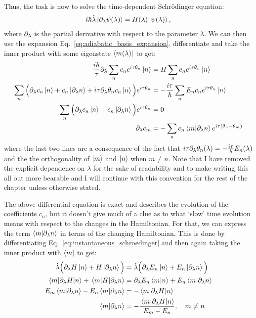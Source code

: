     Thus, the task is now to solve the time-dependent Schr\"{o}dinger equation:
    \begin{equation}\label{eq:td-schroedinger}
        i\hbar \dot{\lambda} \ket{\partial_{\lambda} \psi(\lambda)} = H(\lambda) \ket{\psi(\lambda)},
    \end{equation}
    where $\partial_{\lambda}$ is the partial derivative with respect to the parameter $\lambda$. We can then use the expansion Eq.~\eqref{eq:adiabatic_basis_expansion}, differentiate and take the inner product with some eigenstate $\bra{m(\lambda)}$ to get:
    \begin{equation}\label{eq:adiabatic_derivation}
        \begin{aligned}
         \frac{i\hbar}{\tau} \partial_{\lambda} \sum_n c_n e^{i \tau \theta_n} \ket{n} &= H \sum_n c_n e^{i \tau \theta_n} \ket{n} \\
        \sum_n \Big( \partial_{\lambda} c_n \ket{n} + c_n \ket{\partial_{\lambda} n} + i \tau \partial_{\lambda}\theta_n c_n \ket{n} \Big)e^{i \tau \theta_n} &= -\frac{i \tau}{\hbar} \sum_n E_n c_n e^{i \tau \theta_n} \ket{n} \\
        \sum_n \Big( \partial_{\lambda} c_n \ket{n} + c_n \ket{\partial_{\lambda} n} \Big)e^{i \tau \theta_n} &= 0 \\
        \partial_{\lambda} c_m  &= - \sum_n c_n \braket{m}{\partial_{\lambda} n}e^{i\tau(\theta_n-\theta_m)}
        \end{aligned}
    \end{equation}
    where the last two lines are a consequence of the fact that $i \tau \partial_{\lambda} \theta_n(\lambda) = -\frac{i \tau}{\hbar} E_n(\lambda)$ and the the orthogonality of $\ket{m}$ and $\ket{n}$ when $m \neq n$. Note that I have removed the explicit dependence on $\lambda$ for the sake of readability and to make writing this all out more bearable and I will continue with this convention for the rest of the chapter unless otherwise stated. 
    
    The above differential equation is exact and describes the evolution of the coefficients $c_n$,  but it doesn't give much of a clue as to what `slow' time evolution means with respect to the changes in the Hamiltonian. For that, we can express the term $\braket{m}{\partial_{\lambda} n}$ in terms of the changing Hamiltonian. This is done by differentiating Eq.~\eqref{eq:instantaneous_schroedinger} and then again taking the inner product with $\bra{m}$ to get:
    \begin{equation}\label{eq:hamiltonian_derivative}
        \begin{aligned}
            \dot{\lambda} \Big(\partial_{\lambda}{H}\ket{n} + H \ket{\partial_{\lambda} n}\Big)  &= \dot{\lambda} \Big(\partial_{\lambda}{E_n}\ket{n} + E_n \ket{\partial_{\lambda} n}\Big) \\
            \mel{m}{\partial_{\lambda}H}{n} + \mel{m}{H}{\partial_{\lambda}n} &= \partial_{\lambda} E_n\braket{m}{n} + E_n \braket{m}{\partial_{\lambda} n} \\
            E_m \braket{m}{\partial_{\lambda} n} - E_n \braket{m}{\partial_{\lambda} n} &= - \mel{m}{\partial_{\lambda}H}{n} \\
            \braket{m}{\partial_{\lambda} n} &= - \frac{\mel{m}{\partial_{\lambda}H}{n}}{E_m - E_n}, \quad m \neq n
        \end{aligned}
    \end{equation}
    
